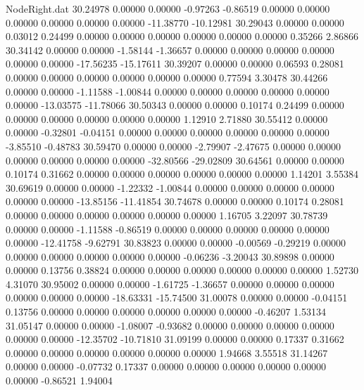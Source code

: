 \begin{filecontents}{NodeRight.dat}
  30.24978    0.00000    0.00000    -0.97263   -0.86519    0.00000    0.00000    0.00000    0.00000    0.00000    0.00000  -11.38770  -10.12981
  30.29043    0.00000    0.00000     0.03012    0.24499    0.00000    0.00000    0.00000    0.00000    0.00000    0.00000    0.35266    2.86866
  30.34142    0.00000    0.00000    -1.58144   -1.36657    0.00000    0.00000    0.00000    0.00000    0.00000    0.00000  -17.56235  -15.17611
  30.39207    0.00000    0.00000     0.06593    0.28081    0.00000    0.00000    0.00000    0.00000    0.00000    0.00000    0.77594    3.30478
  30.44266    0.00000    0.00000    -1.11588   -1.00844    0.00000    0.00000    0.00000    0.00000    0.00000    0.00000  -13.03575  -11.78066
  30.50343    0.00000    0.00000     0.10174    0.24499    0.00000    0.00000    0.00000    0.00000    0.00000    0.00000    1.12910    2.71880
  30.55412    0.00000    0.00000    -0.32801   -0.04151    0.00000    0.00000    0.00000    0.00000    0.00000    0.00000   -3.85510   -0.48783
  30.59470    0.00000    0.00000    -2.79907   -2.47675    0.00000    0.00000    0.00000    0.00000    0.00000    0.00000  -32.80566  -29.02809
  30.64561    0.00000    0.00000     0.10174    0.31662    0.00000    0.00000    0.00000    0.00000    0.00000    0.00000    1.14201    3.55384
  30.69619    0.00000    0.00000    -1.22332   -1.00844    0.00000    0.00000    0.00000    0.00000    0.00000    0.00000  -13.85156  -11.41854
  30.74678    0.00000    0.00000     0.10174    0.28081    0.00000    0.00000    0.00000    0.00000    0.00000    0.00000    1.16705    3.22097
  30.78739    0.00000    0.00000    -1.11588   -0.86519    0.00000    0.00000    0.00000    0.00000    0.00000    0.00000  -12.41758   -9.62791
  30.83823    0.00000    0.00000    -0.00569   -0.29219    0.00000    0.00000    0.00000    0.00000    0.00000    0.00000   -0.06236   -3.20043
  30.89898    0.00000    0.00000     0.13756    0.38824    0.00000    0.00000    0.00000    0.00000    0.00000    0.00000    1.52730    4.31070
  30.95002    0.00000    0.00000    -1.61725   -1.36657    0.00000    0.00000    0.00000    0.00000    0.00000    0.00000  -18.63331  -15.74500
  31.00078    0.00000    0.00000    -0.04151    0.13756    0.00000    0.00000    0.00000    0.00000    0.00000    0.00000   -0.46207    1.53134
  31.05147    0.00000    0.00000    -1.08007   -0.93682    0.00000    0.00000    0.00000    0.00000    0.00000    0.00000  -12.35702  -10.71810
  31.09199    0.00000    0.00000     0.17337    0.31662    0.00000    0.00000    0.00000    0.00000    0.00000    0.00000    1.94668    3.55518
  31.14267    0.00000    0.00000    -0.07732    0.17337    0.00000    0.00000    0.00000    0.00000    0.00000    0.00000   -0.86521    1.94004

\end{filecontents}

